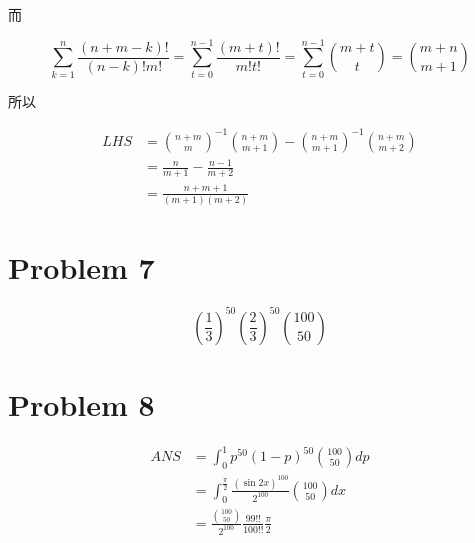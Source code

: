 \documentclass[fontset=windows]{article}
\begin{document}
而

$$
\sum_{k=1}^{n} \frac{(n + m -k)!}{(n-k)!m!} = \sum_{t=0}^{n-1} \frac{(m + t)!}{m!t!} = \sum_{t=0}^{n-1} {m + t \choose t} = {{m + n} \choose {m + 1}}
$$

所以

$$
\begin{aligned}
LHS &= {{n + m} \choose m}^{-1} {{n + m} \choose {m + 1}} - {{n + m} \choose {m + 1}} ^{-1} {{n + m} \choose {m + 2}} \\
    &= \frac{n}{m + 1} - \frac{n - 1}{m + 2} \\
    &= \frac{n + m + 1}{(m + 1)(m + 2)}
\end{aligned}
$$


\section*{Problem 7} $$(\frac 1 3)^{50} (\frac 2 3) ^ {50} {{100} \choose {50}}$$

\section*{Problem 8}
$$
\begin{aligned}
ANS &= \int_0^{1} {p^{50} (1-p)^{50} {{100}\choose{50}} dp} \\
    &= \int_0^{ \frac{\pi}2} \frac{ (\sin{2x})^{100} } {2^{100}} {{100}\choose{50}} dx \\
    &=  {\frac {{ {100} \choose {50} }} {2^{100}}}  { \frac{99!!}{100!!} } \frac{\pi}{2}
\end{aligned}
$$
\end{document}
